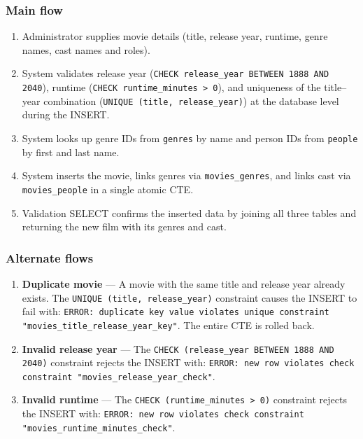 \documentclass[11pt, a4paper]{article}
\begin{document}
\subsubsection{Main flow}

\begin{enumerate}
    \item Administrator supplies movie details (title, release year, runtime,
    genre names, cast names and roles).
    \item System validates release year (\texttt{CHECK release\_year BETWEEN
    1888 AND 2040}), runtime (\texttt{CHECK runtime\_minutes > 0}), and
    uniqueness of the title--year combination (\texttt{UNIQUE (title,
    release\_year)}) at the database level during the INSERT.
    \item System looks up genre IDs from \texttt{genres} by name and person
    IDs from \texttt{people} by first and last name.
    \item System inserts the movie, links genres via \texttt{movies\_genres},
    and links cast via \texttt{movies\_people} in a single atomic CTE.
    \item Validation SELECT confirms the inserted data by joining all three
    tables and returning the new film with its genres and cast.
\end{enumerate}

\subsubsection{Alternate flows}

\begin{enumerate}
    \item \textbf{Duplicate movie} --- A movie with the same title and release
    year already exists. The \texttt{UNIQUE (title, release\_year)} constraint
    causes the INSERT to fail with:
    \texttt{ERROR: duplicate key value violates unique constraint
    "movies\_title\_release\_year\_key"}. The entire CTE is rolled back.

    \item \textbf{Invalid release year} --- The \texttt{CHECK (release\_year
    BETWEEN 1888 AND 2040)} constraint rejects the INSERT with:
    \texttt{ERROR: new row violates check constraint
    "movies\_release\_year\_check"}.

    \item \textbf{Invalid runtime} --- The \texttt{CHECK (runtime\_minutes
    > 0)} constraint rejects the INSERT with:
    \texttt{ERROR: new row violates check constraint
    "movies\_runtime\_minutes\_check"}.
\end{enumerate}
\end{document}
